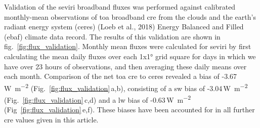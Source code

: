 Validation of the \acrshort{seviri} broadband fluxes was performed against
calibrated monthly-mean observations of \acrshort{toa} broadband \acrshort{cre} from the
clouds and the earth's radiant energy system (\acrshort{ceres}) (Loeb et al., 2018)
Energy Balanced and Filled (\acrshort{ebaf}) climate data record. The results of
this validation are shown in fig.~\ref{fig:flux_validation}. Monthly mean fluxes were calculated
for \acrshort{seviri} by first calculating the mean daily fluxes over each 1x1°
grid square for days in which we have over 23 hours of observations, and
then averaging these daily means over each month. Comparison of the net
\acrshort{toa} \acrshort{cre} to \acrshort{ceres} revealed a bias of -3.67\,\unit{W m^{-2}} (Fig.~\ref{fig:flux_validation}\,a,b), consisting of a \acrshort{sw} bias of -3.04\,\unit{W m^{-2}} (Fig.~\ref{fig:flux_validation}\,c,d) and a \acrshort{lw} bias of -0.63\,\unit{W m^{-2}} (Fig~\ref{fig:flux_validation}\,e,f). These
biases have been accounted for in all further \acrshort{cre} values given in this
article.


